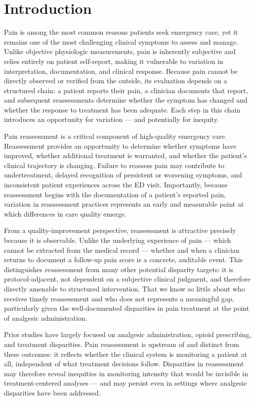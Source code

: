 \section{Introduction}
\label{sec:introduction}

Pain is among the most common reasons patients seek emergency care, yet it remains one of the most challenging clinical symptoms to assess and manage.
Unlike objective physiologic measurements, pain is inherently subjective and relies entirely on patient self-report, making it vulnerable to variation in interpretation, documentation, and clinical response.
Because pain cannot be directly observed or verified from the outside, its evaluation depends on a structured chain: a patient reports their pain, a clinician documents that report, and subsequent reassessments determine whether the symptom has changed and whether the response to treatment has been adequate.
Each step in this chain introduces an opportunity for variation --- and potentially for inequity.

Pain reassessment is a critical component of high-quality emergency care.
Reassessment provides an opportunity to determine whether symptoms have improved, whether additional treatment is warranted, and whether the patient's clinical trajectory is changing.
Failure to reassess pain may contribute to undertreatment, delayed recognition of persistent or worsening symptoms, and inconsistent patient experiences across the ED visit.
Importantly, because reassessment begins with the documentation of a patient's reported pain, variation in reassessment practices represents an early and measurable point at which differences in care quality emerge.

From a quality-improvement perspective, reassessment is attractive precisely because it is observable.
Unlike the underlying experience of pain --- which cannot be extracted from the medical record --- whether and when a clinician returns to document a follow-up pain score is a concrete, auditable event.
This distinguishes reassessment from many other potential disparity targets: it is protocol-adjacent, not dependent on a subjective clinical judgment, and therefore directly amenable to structured intervention.
That we know so little about who receives timely reassessment and who does not represents a meaningful gap, particularly given the well-documented disparities in pain treatment at the point of analgesic administration.

Prior studies have largely focused on analgesic administration, opioid prescribing, and treatment disparities.
Pain reassessment is upstream of and distinct from these outcomes: it reflects whether the clinical system is monitoring a patient at all, independent of what treatment decisions follow.
Disparities in reassessment may therefore reveal inequities in monitoring intensity that would be invisible in treatment-centered analyses --- and may persist even in settings where analgesic disparities have been addressed.

